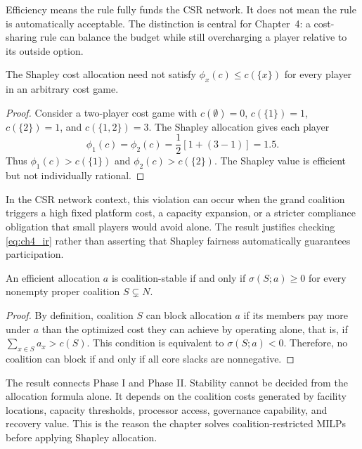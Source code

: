 Efficiency means the rule fully funds the CSR network. It does not mean the rule is automatically acceptable. The distinction is central for Chapter~4: a cost-sharing rule can balance the budget while still overcharging a player relative to its outside option.

\begin{proposition}
\label{prop:ch4_ir_not_automatic}
The Shapley cost allocation need not satisfy $\phi_x(c)\leq c(\{x\})$ for every player in an arbitrary cost game.
\end{proposition}

\begin{proof}
Consider a two-player cost game with $c(\emptyset)=0$, $c(\{1\})=1$, $c(\{2\})=1$, and $c(\{1,2\})=3$. The Shapley allocation gives each player
\begin{equation*}
\phi_1(c)=\phi_2(c)=\frac{1}{2}\left[1+(3-1)\right]=1.5.
\end{equation*}
Thus $\phi_1(c)>c(\{1\})$ and $\phi_2(c)>c(\{2\})$. The Shapley value is efficient but not individually rational.
\end{proof}

In the CSR network context, this violation can occur when the grand coalition triggers a high fixed platform cost, a capacity expansion, or a stricter compliance obligation that small players would avoid alone. The result justifies checking \eqref{eq:ch4_ir} rather than asserting that Shapley fairness automatically guarantees participation.

\begin{proposition}
\label{prop:ch4_core_depends_phase1}
An efficient allocation $a$ is coalition-stable if and only if $\sigma(S;a)\geq 0$ for every nonempty proper coalition $S\subsetneq N$.
\end{proposition}

\begin{proof}
By definition, coalition $S$ can block allocation $a$ if its members pay more under $a$ than the optimized cost they can achieve by operating alone, that is, if $\sum_{x\in S}a_x>c(S)$. This condition is equivalent to $\sigma(S;a)<0$. Therefore, no coalition can block if and only if all core slacks are nonnegative.
\end{proof}

The result connects Phase I and Phase II. Stability cannot be decided from the allocation formula alone. It depends on the coalition costs generated by facility locations, capacity thresholds, processor access, governance capability, and recovery value. This is the reason the chapter solves coalition-restricted MILPs before applying Shapley allocation.

